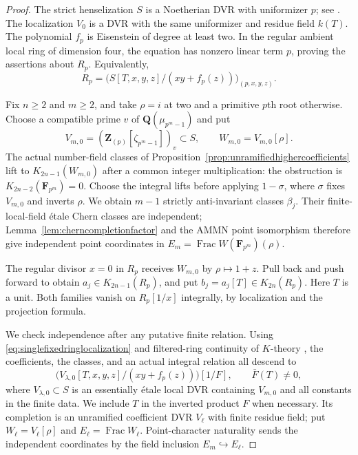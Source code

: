 \documentclass[11pt,a4paper]{article}
\theoremstyle{remark}
\newcommand{\Q}{\mathbf Q}
\newcommand{\Z}{\mathbf Z}
\newcommand{\F}{\mathbf F}
\newcommand{\Frac}{\operatorname{Frac}}
\begin{document}
\begin{proof}
The strict henselization $S$ is a Noetherian DVR with uniformizer
$p$; see \cite[Tag~06LN]{StacksHenselization}.
The localization $V_0$ is a DVR with the same uniformizer and
residue field $k(T)$.
The polynomial $f_p$ is Eisenstein of degree at least two.
In the regular ambient local ring of dimension four, the equation
has nonzero linear term $p$, proving the assertions about $R_p$.
Equivalently,
\begin{equation}\label{eq:singlefixedringlocalization}
 R_p=\bigl(S[T,x,y,z]/(xy+f_p(z))\bigr)_{(p,x,y,z)}.
\end{equation}

Fix $n\geq2$ and $m\geq2$, and take $\rho=i$ at two and a
primitive $p$th root otherwise.
Choose a compatible prime $v$ of $\Q(\mu_{p^m-1})$ and put
\[
 V_{m,0}=(\Z_{(p)}[\zeta_{p^m-1}])_v\subset S,
 \qquad W_{m,0}=V_{m,0}[\rho].
\]
The actual number-field classes of
Proposition~\ref{prop:unramifiedhighercoefficients} lift to
$K_{2n-1}(W_{m,0})$ after a common integer multiplication:
the obstruction is $K_{2n-2}(\F_{p^m})=0$.
Choose the integral lifts before applying $1-\sigma$, where
$\sigma$ fixes $V_{m,0}$ and inverts $\rho$.
We obtain $m-1$ strictly anti-invariant classes $\beta_j$.
Their finite-local-field \'etale Chern classes are independent;
Lemma~\ref{lem:cherncompletionfactor} and the AMMN point isomorphism
therefore give independent point coordinates in
$E_m=\Frac W(\F_{p^m})(\rho)$.

The regular divisor $x=0$ in $R_p$ receives $W_{m,0}$ by
$\rho\mapsto1+z$.
Pull back and push forward to obtain $a_j\in K_{2n-1}(R_p)$,
and put $b_j=a_j[T]\in K_{2n}(R_p)$.
Here $T$ is a unit. Both families vanish on $R_p[1/x]$
integrally, by localization and the projection formula.

We check independence after any putative finite relation.
Using \eqref{eq:singlefixedringlocalization} and
filtered-ring continuity of $K$-theory
\cite[IV, Section~6.4]{Weibel}, the coefficients, the classes,
and an actual integral relation all descend to
\[
 \bigl(V_{\lambda,0}[T,x,y,z]/(xy+f_p(z))\bigr)[1/F],
 \qquad \bar F(T)\ne0,
\]
where $V_{\lambda,0}\subset S$ is an essentially \'etale local
DVR containing $V_{m,0}$ and all constants in the finite data.
We include $T$ in the inverted product $F$ when necessary.
Its completion is an unramified coefficient DVR $V_\ell$ with
finite residue field; put $W_\ell=V_\ell[\rho]$ and
$E_\ell=\Frac W_\ell$.
Point-character naturality sends the independent coordinates by
the field inclusion $E_m\hookrightarrow E_\ell$.


\end{proof}
\end{document}
